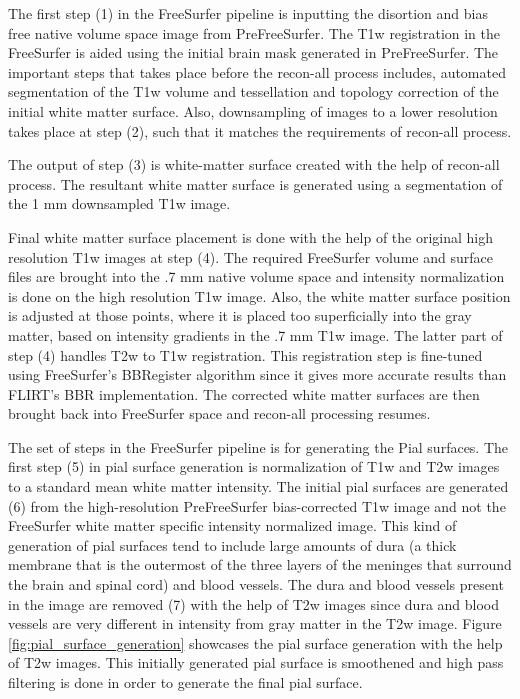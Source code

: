 The first step (1) in the FreeSurfer pipeline is inputting the disortion and bias free native volume space image from PreFreeSurfer. The T1w registration in the FreeSurfer is aided using the initial brain mask generated in PreFreeSurfer. The important steps that takes place before the recon-all process includes, automated segmentation of the T1w volume and tessellation and topology correction of the initial white matter surface. Also, downsampling of images to a lower resolution takes place at step (2), such that it matches the requirements of recon-all process.

The output of step (3) is white-matter surface created with the help of recon-all process. The resultant white matter surface is generated using a segmentation of the 1 mm downsampled T1w image.

Final white matter surface placement is done with the help of the original high resolution T1w images at step (4). The required FreeSurfer volume and surface files are brought into the .7 mm native volume space and intensity normalization is done on the high resolution T1w image. Also, the white matter surface position is adjusted at those points, where it is placed too superficially into the gray matter, based on intensity gradients in the .7 mm T1w image. The latter part of step (4) handles T2w to T1w registration. This registration step is fine-tuned using FreeSurfer's BBRegister algorithm since it gives more accurate results than FLIRT's BBR implementation. The corrected white matter surfaces are then brought back into FreeSurfer space and recon-all processing resumes.

The set of steps in the FreeSurfer pipeline is for generating the Pial surfaces. The first step (5) in pial surface generation is normalization of T1w and T2w images to a standard mean white matter intensity. The initial pial surfaces are generated (6) from the high-resolution PreFreeSurfer bias-corrected T1w image and not the FreeSurfer white matter specific intensity normalized image. This kind of generation of pial surfaces tend to include large amounts of dura (a thick membrane that is the outermost of the three layers of the meninges that surround the brain and spinal cord) and blood vessels. The dura and blood vessels present in the image are removed (7) with the help of T2w images since dura and blood vessels are very different in intensity from gray matter in the T2w image. Figure \ref{fig:pial_surface_generation} showcases the pial surface generation with the help of T2w images. This initially generated pial surface is smoothened and high pass filtering is done in order to generate the final pial surface.

